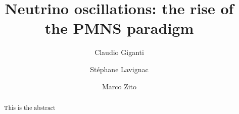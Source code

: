 \documentclass[preprint,12pt]{elsarticle}
\begin{document}
\begin{frontmatter}



\title{Neutrino oscillations: the rise of the PMNS paradigm}


\author{Claudio Giganti}
\address{LPNHE, CNRS/IN2P3, UPMC, Universit\'{e} Paris Diderot, Paris 75252, France}

\author{St\'ephane Lavignac}

\address{IPhT, CEA Saclay, 91191 Gif-sur-Yvette CEDEX, France}

\author{Marco Zito}

\address{IRFU/SPP, CEA Saclay, 91191 Gif-sur-Yvette CEDEX, France}

\begin{abstract}
This is the abstract
\end{abstract}

\begin{keyword}



\end{keyword}

\end{frontmatter}





\end{document}
